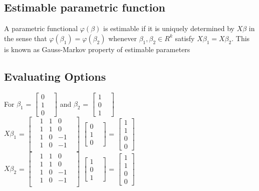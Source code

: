 \documentclass{article}
\begin{document}
\subsection{Estimable parametric function}
 A parametric functional $\varphi(\beta)$ is estimable if it is uniquely determined by $X \beta$ in the sense that $\varphi(\beta_1) = \varphi (\beta_2)$ whenever $\beta_1,\beta_2 \in R^k$ satisfy $X \beta_1 = X \beta_2$.
This is known as Gauss-Markov property of estimable parameters

\subsection{Evaluating Options}
For $\beta_1$ = $\begin{bmatrix} 0&\\ 1&\\ 0& \end{bmatrix}$ and $\beta_2$ = $\begin{bmatrix} 1&\\ 0&\\ 1& \end{bmatrix}$\\
$X\beta_1$ = $\begin{bmatrix}
    &1&   1&   0&\\
    &1&   1&   0&\\
    &1&   0&  -1&\\
    &1&   0&  -1&\\
\end{bmatrix}$ $\begin{bmatrix} 0&\\ 1&\\ 0& \end{bmatrix}$ = $\begin{bmatrix} 1 \\ 1 \\ 0\\ 0\end{bmatrix}$ \\
$X\beta_2$ = $\begin{bmatrix}
    &1&   1&   0&\\
    &1&   1&   0&\\
    &1&   0&  -1&\\
    &1&   0&  -1&\\
\end{bmatrix}$ $\begin{bmatrix} 1&\\ 0&\\ 1& \end{bmatrix}$ = $\begin{bmatrix} 1 \\ 1 \\ 0\\ 0\end{bmatrix}$ \\
\end{document}
